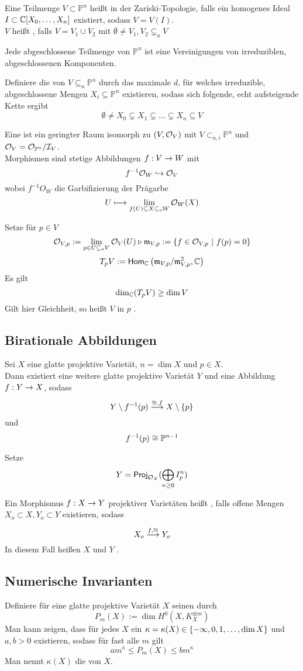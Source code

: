 \documentclass{article}
\renewcommand{\i}{^{-1}}
\renewcommand{\P}{\mathbb{P}}
\newcommand{\mf}{\mathfrak{m}}
\begin{document}
 Eine Teilmenge $V \subset \P^n$ heißt  in der Zariski-Topologie, falls ein homogenes Ideal $I \subset \mathbb{C}[X_0,\ldots, X_n]$ existiert, sodass $V = V(I)$.\\
$V$ heißt , falls $V = V_1 \cup V_2$ mit $\emptyset \neq V_1, V_2 \subsetneq_a V$

\Bem{}
Jede abgeschlossene Teilmenge von $\P^n$ ist eine Vereinigungen von irreduziblen, abgeschlossenen Komponenten.

\Def{}
Definiere die  von $V \subseteq_a \P^n$ durch das maximale $d$, für welches irreduzible, abgeschlossene Mengen $X_i \subseteq \P^n$ existieren, sodass sich folgende, echt aufsteigende Kette ergibt
\[ \emptyset \neq X_0 \subsetneq X_1 \subsetneq \ldots \subsetneq X_n \subseteq V \]

\Def{}
Eine  ist ein geringter Raum isomorph zu $(V, \mathcal{O}_V)$ mit $V \subset_{a,i} \P^n$ und $\O_V = \O_{\P^n} / \I_V$.\\
Morphismen sind stetige Abbildungen $f : V \overset{}{\rightarrow} W$ mit
\[ f\i \O_W \inj{} \O_V \]
wobei $f\i O_W$ die Garbifizierung der Prägarbe
\[ U \longmapsto \lim_{f(U) \subseteq X \subseteq_o W } \mathcal{O}_W(X) \]

\Def{}
Setze für $p \in V$
\[ \O_{V,p} := \lim_{p \in U \subseteq_o V} \O_V(U) \triangleright \mf_{V,p} := \set{f \in \O_{V,p}}{f(p) = 0} \]
\[ T_pV := \Hom{\C}{\mf_{V,p} /\mf_{V,p}^2}{\C} \]
Es gilt
\[ \dim_{\mathbb{C}}(T_pV) \geq \dim V \]
Gilt hier Gleichheit, so heißt $V$ in $p$ .

\subsection{Birationale Abbildungen}
Sei $X$ eine glatte projektive Varietät, $n = \dim X$ und $p \in X$.\\
Dann existiert eine weitere glatte projektive Varietät $Y$ und eine Abbildung $f : Y \overset{}{\rightarrow} X$, sodass
\[ Y \setminus f\i(p) \Pfeil{\isom{}, f} X \setminus \{p\} \]
und
\[ f\i(p) \isom{} \P^{n-1} \]
\begin{Beweis}{}
Setze
\[ Y = \textsf{Proj}_{\mathcal{O}_X}( \bigoplus_{n\geq 0} I_p^n) \]
\end{Beweis}

\Def{}
Ein Morphismus $f : X \overset{}{\rightarrow} Y$ projektiver Varietäten heißt , falls offene Mengen $X_o \subset X, Y_o \subset Y$ existieren, sodass
\[ X_o \overset{f, \overset{}{\cong}}{\longrightarrow} Y_o \]
In diesem Fall heißen $X$ und $Y$ .

\subsection{Numerische Invarianten}
Definiere für eine glatte projektive Varietät $X$ seinen  durch
\[ P_m(X) := \dim H^0(X, K_X^{\otimes m}) \]
Man kann zeigen, dass für jedes $X$ ein $\kappa = \kappa(X) \in \set{-\infty, 0, 1, \ldots, \dim X}{}$ und $a,b > 0$ existieren, sodass für fast alle $m$ gilt
\[ a m^\kappa \leq P_m(X) \leq bm^\kappa \]
Man nennt $\kappa(X)$ die  von $X$.
\end{document}
